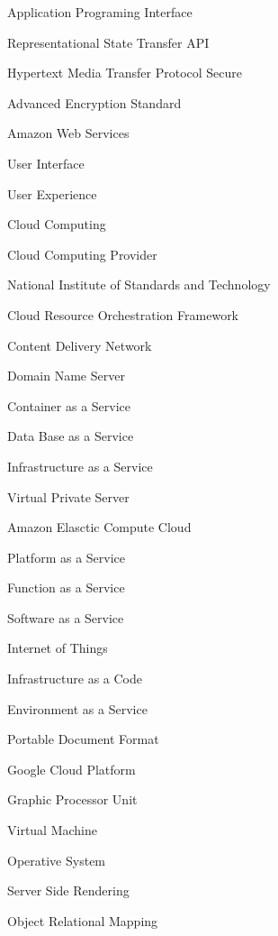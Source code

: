     {Application Programing Interface}

    {\gls{Representational State Transfer API}}

    {\gls{Hypertext Media Transfer Protocol Secure}}

    {Advanced Encryption Standard}
 
    {\gls{Amazon Web Services}}
  
    {\gls{User Interface}}

    {User Experience}

    {\gls{Cloud Computing}}

    {\gls{Cloud Computing Provider}}

    {National Institute of Standards and Technology}

    {Cloud Resource Orchestration Framework}

    {Content Delivery Network}

    {Domain Name Server}

    {Container as a Service}

    {Data Base as a Service}

    {Infrastructure as a Service}

    {Virtual Private Server}

    {Amazon Elasctic Compute Cloud}

    {Platform as a Service}

    {Function as a Service}

    {Software as a Service}

    {Internet of Things}

    {Infrastructure as a Code}

    {Environment as a Service}

    {Portable Document Format}

    {Google Cloud Platform}

    {Graphic Processor Unit}

    {Virtual Machine}

    {Operative System}

    {Server Side Rendering}

    {Object Relational Mapping}